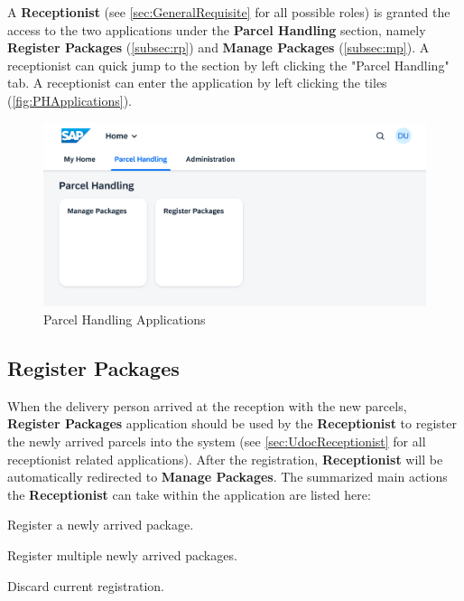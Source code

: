 A \textbf{Receptionist} (see \autoref{sec:GeneralRequisite} for all possible roles) is granted the access to the two applications under the \textbf{Parcel Handling} section, namely \textbf{Register Packages} (\autoref{subsec:rp}) and \textbf{Manage Packages} (\autoref{subsec:mp}). A receptionist can quick jump to the section by left clicking the "Parcel Handling" tab. A receptionist can enter the application by left clicking the tiles (\autoref{fig:PHApplications}).

\begin{figure}[htb!]
	\centering
	\includegraphics[width=1\linewidth]{images/user_doc/overviews/ParcelHandlingTab.png}
	\caption{Parcel Handling Applications}
	\label{fig:PHApplications}
\end{figure}


\subsection{Register Packages}
\label{subsec:rp}

When the delivery person arrived at the reception with the new parcels, \textbf{Register Packages} application should be used by the \textbf{Receptionist} to register the newly arrived parcels into the system (see \autoref{sec:UdocReceptionist} for all receptionist related applications).  After the registration, \textbf{Receptionist} will be automatically redirected to  \textbf{Manage Packages}.
The summarized main actions the \textbf{Receptionist} can take within the application are listed here:

\begin{compactenum}
	\item Register a newly arrived package.
    \item Register multiple newly arrived packages.
    \item Discard current registration.
\end{compactenum}


